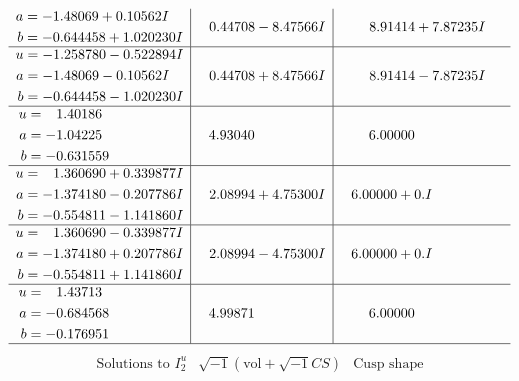 \documentclass[1p]{elsarticle_modified}
\theoremstyle{definition}
\newcommand{\I}{\sqrt{-1}}
\begin{document}
$$\begin{array}{c|c|c}
\begin{aligned}
a &= -1.48069 + 0.10562 I \\
b &= -0.644458 + 1.020230 I\end{aligned}
 & \phantom{-}0.44708 - 8.47566 I & \phantom{-}8.91414 + 7.87235 I \\ \hline\begin{aligned}
u &= -1.258780 - 0.522894 I \\
a &= -1.48069 - 0.10562 I \\
b &= -0.644458 - 1.020230 I\end{aligned}
 & \phantom{-}0.44708 + 8.47566 I & \phantom{-}8.91414 - 7.87235 I \\ \hline\begin{aligned}
u &= \phantom{-}1.40186\phantom{ +0.000000I} \\
a &= -1.04225\phantom{ +0.000000I} \\
b &= -0.631559\phantom{ +0.000000I}\end{aligned}
 & \phantom{-}4.93040\phantom{ +0.000000I} & \phantom{-}6.00000\phantom{ +0.000000I} \\ \hline\begin{aligned}
u &= \phantom{-}1.360690 + 0.339877 I \\
a &= -1.374180 - 0.207786 I \\
b &= -0.554811 - 1.141860 I\end{aligned}
 & \phantom{-}2.08994 + 4.75300 I & \phantom{-}6.00000 + 0. I\phantom{ +0.000000I} \\ \hline\begin{aligned}
u &= \phantom{-}1.360690 - 0.339877 I \\
a &= -1.374180 + 0.207786 I \\
b &= -0.554811 + 1.141860 I\end{aligned}
 & \phantom{-}2.08994 - 4.75300 I & \phantom{-}6.00000 + 0. I\phantom{ +0.000000I} \\ \hline\begin{aligned}
u &= \phantom{-}1.43713\phantom{ +0.000000I} \\
a &= -0.684568\phantom{ +0.000000I} \\
b &= -0.176951\phantom{ +0.000000I}\end{aligned}
 & \phantom{-}4.99871\phantom{ +0.000000I} & \phantom{-}6.00000\phantom{ +0.000000I}\\
 \hline 
 \end{array}$$\newpage$$\begin{array}{c|c|c}  
\text{Solutions to }I^u_{2}& \I (\text{vol} + \sqrt{-1}CS) & \text{Cusp shape}\\

\end{array}$$
\end{document}
